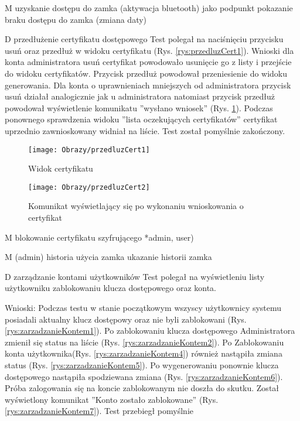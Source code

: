 \begin{enumerate*}
\begin{figure}[ht!]
	
	\end{figure}
	
	
	\item M uzyskanie dostępu do zamka (aktywacja bluetooth)
		 jako podpunkt pokazanie braku dostępu do zamka (zmiana daty)
	\item D przedłużenie certyfikatu dostępowego
	Test polegał na naciśnięciu przycisku usuń oraz przedłuż w widoku certyfikatu (Rys. \ref{rys:przedluzCert1}).
	Wnioski dla konta administratora usuń certyfikat powodowało usunięcie go z listy i przejście do widoku certyfikatów. Przycisk przedłuż powodował przeniesienie do widoku generowania. Dla konta o uprawnieniach  mniejszych od administratora przycisk usuń działał analogicznie jak u administratora natomiast przycisk przedłuż powodował wyświetlenie komunikatu ''wysłano wniosek'' (Rys. \ref{rys:przedluzCert2}).
	Podczas ponownego sprawdzenia  widoku ''lista oczekujących certyfikatów'' certyfikat uprzednio zawnioskowany  widniał  na liście. Test został pomyślnie zakończony.
	
	
		\begin{figure}[ht!]
		
		\begin{minipage}{0.2\textwidth}
			\texttt{[image: Obrazy/przedluzCert1]}
			\caption{Widok certyfikatu }
			\label{rys:przedluzCert1}
		\end{minipage}
		
		\begin{minipage}{0.2\textwidth}
			\texttt{[image: Obrazy/przedluzCert2]}
			\caption{Komunikat wyświetlający się po wykonaniu wnioskowania o certyfikat }
			\label{rys:przedluzCert2}
		\end{minipage}
		
		
	
		
	\end{figure}
	
	
	\item M blokowanie certyfikatu szyfrującego *admin, user)
	\item M (admin) historia użycia zamka
	ukazanie historii zamka
	\item D zarządzanie kontami użytkowników
		Test polegał na wyświetleniu listy użytkowniku zablokowaniu klucza dostępowego oraz konta.
		
		Wnioski: Podczas testu w stanie początkowym wszyscy użytkownicy systemu posiadali aktualny klucz dostępowy oraz nie byli zablokowani (Rys. \ref{rys:zarzadzanieKontem1}). Po zablokowaniu klucza dostępowego  Administratora zmienił się status na liście (Rys. \ref{rys:zarzadzanieKontem2}). Po Zablokowaniu konta użytkownika(Rys. \ref{rys:zarzadzanieKontem4}) również nastąpiła zmiana  status  (Rys. \ref{rys:zarzadzanieKontem5}). Po wygenerowaniu ponownie klucza dostępowego nastąpiła spodziewana zmiana (Rys. \ref{rys:zarzadzanieKontem6}). Próba zalogowania się na koncie zablokowanym nie doszła do skutku. Został wyświetlony komunikat ''Konto zostało zablokowane'' (Rys. \ref{rys:zarzadzanieKontem7}). Test przebiegł pomyślnie		
		

\end{enumerate*}
